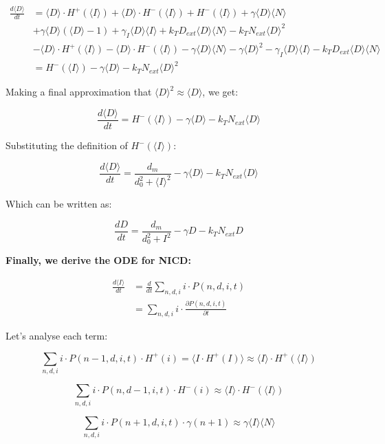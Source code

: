 \documentclass{article}
\begin{document}
\begin{flushleft}
\begin{align*}
\frac{d\langle D \rangle}{dt} &= \langle D \rangle \cdot H^+(\langle I \rangle) + \langle D \rangle \cdot H^-(\langle I \rangle) + H^-(\langle I \rangle) + \gamma \langle D \rangle \langle N \rangle \\
&+ \gamma \langle D \rangle (\langle D \rangle - 1) + \gamma_I \langle D \rangle \langle I \rangle + k_T D_{ext} \langle D \rangle \langle N \rangle - k_T N_{ext} \langle D \rangle^2 \\
&- \langle D \rangle \cdot H^+(\langle I \rangle) - \langle D \rangle \cdot H^-(\langle I \rangle) - \gamma \langle D \rangle \langle N \rangle - \gamma \langle D \rangle^2 - \gamma_I \langle D \rangle \langle I \rangle - k_T D_{ext} \langle D \rangle \langle N \rangle \\
&= H^-(\langle I \rangle) - \gamma \langle D \rangle - k_T N_{ext} \langle D \rangle^2
\end{align*}

Making a final approximation that $\langle D \rangle^2 \approx \langle D \rangle$, we get:

\[
\frac{d\langle D \rangle}{dt} = H^-(\langle I \rangle) - \gamma \langle D \rangle - k_T N_{ext} \langle D \rangle
\]

Substituting the definition of $H^-(\langle I \rangle)$:

\[
\frac{d\langle D \rangle}{dt} = \frac{d_m}{d_0^2 + \langle I \rangle^2} - \gamma \langle D \rangle - k_T N_{ext} \langle D \rangle
\]

Which can be written as:

\[
\frac{dD}{dt} = \frac{d_m}{d_0^2 + I^2} - \gamma D - k_T N_{ext} D
\]

\textbf{Finally, we derive the ODE for NICD:}

\begin{align*}
\frac{d\langle I \rangle}{dt} &= \frac{d}{dt}\sum_{n,d,i} i \cdot P(n,d,i,t) \\
&= \sum_{n,d,i} i \cdot \frac{\partial P(n,d,i,t)}{\partial t}
\end{align*}

Let's analyse each term:

\[
\sum_{n,d,i} i \cdot P(n-1,d,i,t) \cdot H^+(i) = \langle I \cdot H^+(I) \rangle \approx \langle I \rangle \cdot H^+(\langle I \rangle)
\]

\[
\sum_{n,d,i} i \cdot P(n,d-1,i,t) \cdot H^-(i) \approx \langle I \rangle \cdot H^-(\langle I \rangle)
\]

\[
\sum_{n,d,i} i \cdot P(n+1,d,i,t) \cdot \gamma(n+1) \approx \gamma \langle I \rangle \langle N \rangle
\]


\end{flushleft}
\end{document}
